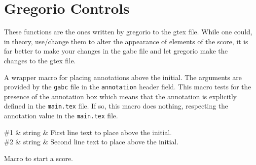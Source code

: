 %
%
%
%
%
%
\section{Gregorio Controls}

These functions are the ones written by gregorio to the gtex file.
While one could, in theory, use/change them to alter the appearance of
elements of the score, it is far better to make your changes in the
gabc file and let gregorio make the changes to the gtex file.

A wrapper macro for placing annotations above the initial. The
arguments are provided by the \texttt{gabc} file in the
\texttt{annotation} header field.  This macro tests for the presence
of the annotation box which means that the annotation is explicitly
defined in the \texttt{main.tex} file. If so, this macro does nothing,
respecting the annotation value in the \texttt{main.tex} file.

\begin{argtable}
	\#1 & string & First line text to place above the initial.\\
	\#2 & string & Second line text to place above the initial.\\
\end{argtable}

Macro to start a score.

